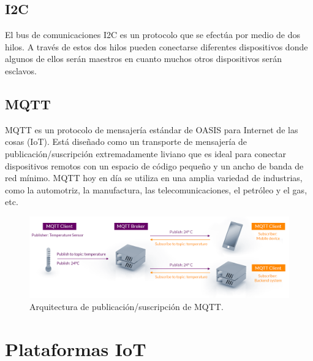 \subsection{I2C}
El bus de comunicaciones I2C  es un protocolo que se efectúa por medio de dos hilos. A través de estos dos hilos pueden conectarse diferentes dispositivos donde algunos de ellos serán maestros en cuanto muchos otros dispositivos serán esclavos.
\subsection{MQTT}
MQTT es un protocolo de mensajería estándar de OASIS para Internet de las cosas (IoT). Está diseñado como un transporte de mensajería de publicación/suscripción extremadamente liviano que es ideal para conectar dispositivos remotos con un espacio de código pequeño y un ancho de banda de red mínimo. MQTT hoy en día se utiliza en una amplia variedad de industrias, como la automotriz, la manufactura, las telecomunicaciones, el petróleo y el gas, etc.

\begin{figure}[htbp]
	\centering
	\includegraphics[width=1\textwidth]{./Figures/mqtt-publish-subscribe.png}
	\caption{Arquitectura de publicación/suscripción de MQTT.}
\end{figure}
\section{Plataformas IoT}
